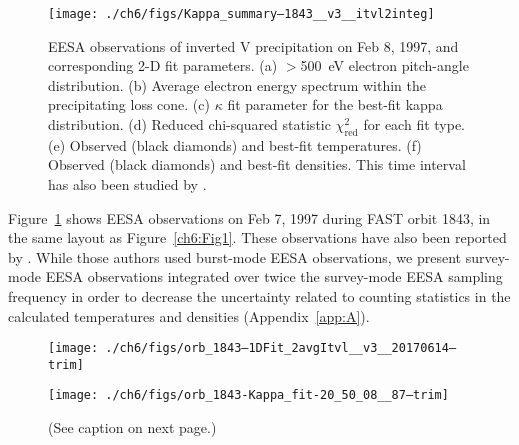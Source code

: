   \begin{figure}
    \centering
    \noindent\texttt{[image: ./ch6/figs/Kappa\_summary--1843\_\_v3\_\_itvl2integ]}
    \caption[Inverted V precipitation and best-fit Maxwellian and kappa
    distribution parameters (Orbit 1843)]{EESA observations of inverted V
      precipitation on Feb 8, 1997, and corresponding 2-D fit parameters. (a)
      $>$500~eV electron pitch-angle distribution. (b) Average electron energy spectrum
      within the precipitating loss cone. (c) $\kappa$ fit parameter for the
      best-fit kappa distribution. (d) Reduced chi-squared statistic
      $\chi^2_{\mathrm{red}}$ for each fit type. (e) Observed (black diamonds)
      and best-fit temperatures. (f) Observed (black diamonds) and best-fit
      densities. This time interval has also been studied by
      \citet{Ergun1998a,Ergun1998}.}
    \label{ch6:Fig4}
  \end{figure}


  Figure~\ref{ch6:Fig4} shows EESA observations on Feb 7, 1997 during FAST orbit
  1843, in the same layout as Figure~\ref{ch6:Fig1}. These observations have
  also been reported by \citet{Ergun1998a,Ergun1998}. While those authors used
  burst-mode EESA observations, we present survey-mode EESA observations
  integrated over twice the survey-mode EESA sampling frequency in order
  to decrease the uncertainty related to counting statistics in the calculated
  temperatures and densities (Appendix~\ref{app:A}).


  \begin{figure}
    \centering

    \noindent\texttt{[image: ./ch6/figs/orb\_1843--1DFit\_2avgItvl\_\_v3\_\_20170614--trim]}

    \vspace{1cm}

    \noindent\texttt{[image: ./ch6/figs/orb\_1843-Kappa\_fit-20\_50\_08\_\_87--trim]}

    \caption[Example one- and two-dimensional fits of observed inverted-V
    electron distributions (Orbit 1843)]{(See caption on next page.)}

    \label{ch6:Fig5}
  \end{figure}

